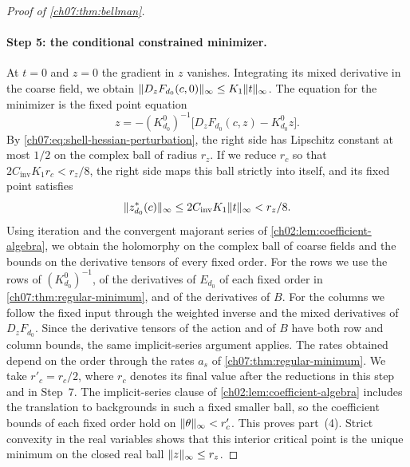 \begin{proof}[Proof of \cref{ch07:thm:bellman}]
\paragraph{Step 5: the conditional constrained minimizer.}
At $t=0$ and $z=0$ the gradient in $z$ vanishes. Integrating its mixed derivative in the coarse field, we obtain $\lVert D_zF_{d_0}(c,0)\rVert_\infty\le K_1\lVert t\rVert_\infty$. The equation for the minimizer is the fixed point equation
\[
 z=-(K_{d_0}^0)^{-1}\bigl[D_zF_{d_0}(c,z)-K_{d_0}^0z\bigr].
\]
By \eqref{ch07:eq:shell-hessian-perturbation}, the right side has Lipschitz constant at most $1/2$ on the complex ball of radius $r_z$. If we reduce $r_c$ so that $2C_{\mathrm{inv}}K_1r_c<r_z/8$, the right side maps this ball strictly into itself, and its fixed point satisfies
\[
 \lVert z_{d_0}^*(c)\rVert_\infty\le2C_{\mathrm{inv}}K_1\lVert t\rVert_\infty<r_z/8 .
\]
Using iteration and the convergent majorant series of \cref{ch02:lem:coefficient-algebra}, we obtain the holomorphy on the complex ball of coarse fields and the bounds on the derivative tensors of every fixed order. For the rows we use the rows of $(K_{d_0}^0)^{-1}$, of the derivatives of $E_{d_0}$ of each fixed order in \cref{ch07:thm:regular-minimum}, and of the derivatives of $B$. For the columns we follow the fixed input through the weighted inverse and the mixed derivatives of $D_zF_{d_0}$. Since the derivative tensors of the action and of $B$ have both row and column bounds, the same implicit-series argument applies. The rates obtained depend on the order through the rates $a_s$ of \cref{ch07:thm:regular-minimum}. We take $r'_c=r_c/2$, where $r_c$ denotes its final value after the reductions in this step and in Step~7. The implicit-series clause of \cref{ch02:lem:coefficient-algebra} includes the translation to backgrounds in such a fixed smaller ball, so the coefficient bounds of each fixed order hold on $\lVert \theta\rVert_\infty<r'_c$. This proves part~(4). Strict convexity in the real variables shows that this interior critical point is the unique minimum on the closed real ball $\lVert z\rVert_\infty\le r_z$.


\end{proof}
